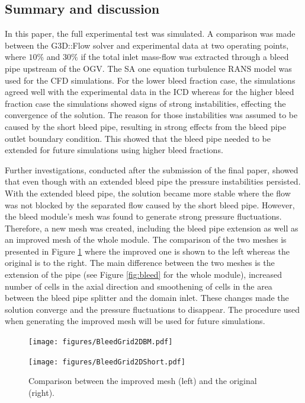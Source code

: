 \subsection{Summary and discussion}
In this paper, the full experimental test was simulated. A comparison was made between the G3D::Flow solver and experimental data at two operating points, where $10\%$ and $30\%$ if the total inlet mass-flow was extracted through a bleed pipe upstream of the OGV. The SA one equation turbulence RANS model was used for the CFD simulations. For the lower bleed fraction case, the simulations agreed well with the experimental data in the ICD whereas for the higher bleed fraction case the simulations showed signs of strong instabilities, effecting the convergence of the solution. The reason for those instabilities was assumed to be caused by the short bleed pipe, resulting in strong effects from the bleed pipe outlet boundary condition. This showed that the bleed pipe needed to be extended for future simulations using higher bleed fractions.

Further investigations, conducted after the submission of the final paper, showed that even though with an extended bleed pipe the pressure instabilities persisted. With the extended bleed pipe, the solution became more stable where the flow was not blocked by the separated flow caused by the short bleed pipe. However, the bleed module's mesh was found to generate strong pressure fluctuations. Therefore, a new mesh was created, including the bleed pipe extension as well as an improved mesh of the whole module. The comparison of the two meshes is presented in Figure \ref{fig:BleedComp} where the improved one is shown to the left whereas the original is to the right. The main difference between the two meshes is the extension of the pipe (see Figure \ref{fig:bleed} for the whole module), increased number of cells in the axial direction and smoothening of cells in the area between the bleed pipe splitter and the domain inlet. These changes made the solution converge and the pressure fluctuations to disappear. The procedure used when generating the improved mesh will be used for future simulations.
\begin{figure}[H]
  \centering
  \begin{minipage}{0.49\columnwidth}
  \texttt{[image: figures/BleedGrid2DBM.pdf]}
  \end{minipage}
  \begin{minipage}{0.49\columnwidth}
  \texttt{[image: figures/BleedGrid2DShort.pdf]}
  \end{minipage}
    \caption{Comparison between the improved mesh (left) and the original (right).}\label{fig:BleedComp}
\end{figure}



